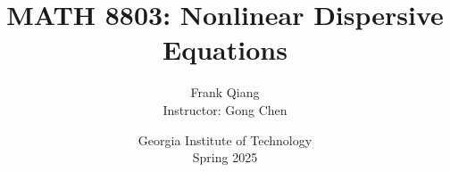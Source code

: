 \documentclass[12pt, letterpaper, oneside]{book}
\title{MATH 8803: Nonlinear Dispersive Equations}
\author{Frank Qiang\\Instructor: Gong Chen}
\date{Georgia Institute of Technology\\Spring 2025}
\theoremstyle{definition}
\begin{document}
  \maketitle

  \begingroup
  \let\cleardoublepage\clearpage
  \tableofcontents
  \endgroup

  
  
  
  
  
  
  
  
  
  
  
  
  
  
  
  
  
  
  
  
  
  
\end{document}
